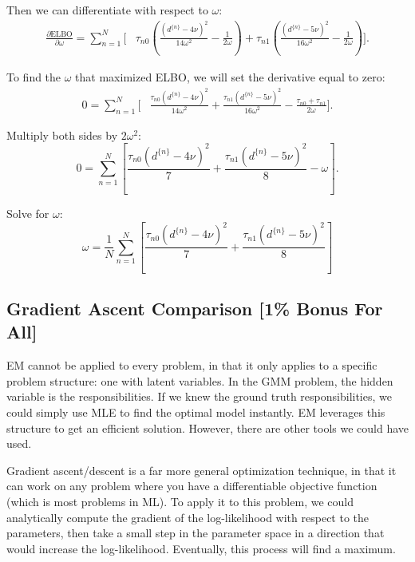 \begin{enumerate}[label=\alph*.]
    Then we can differentiate with respect to \(\omega\):
    \[
    \begin{aligned}
    \frac{\partial\text{ELBO}}{\partial\omega}
    =\sum_{n=1}^N\Bigg[&
    \tau_{n0}\left(
    \frac{(d^{\{n\}}-4\nu)^2}{14\omega^2}
    -\frac{1}{2\omega}\right)
    +\tau_{n1}\left(
    \frac{(d^{\{n\}}-5\nu)^2}{16\omega^2}
    -\frac{1}{2\omega}\right)\Bigg].
    \end{aligned}
    \]
    
    To find the $\omega$ that maximized ELBO, we will set the derivative equal to zero:
    \[
    \begin{aligned}
    0=\sum_{n=1}^N\Bigg[&
    \frac{\tau_{n0}(d^{\{n\}}-4\nu)^2}{14\omega^2}
    +\frac{\tau_{n1}(d^{\{n\}}-5\nu)^2}{16\omega^2}
    -\frac{\tau_{n0}+\tau_{n1}}{2\omega}\Bigg].
    \end{aligned}
    \]
    
    Multiply both sides by \(2\omega^2\):
    \[
    0=\sum_{n=1}^N\left[
    \frac{\tau_{n0}(d^{\{n\}}-4\nu)^2}{7}
    +\frac{\tau_{n1}(d^{\{n\}}-5\nu)^2}{8}
    -\omega\right].
    \]
    
    Solve for \(\omega\):
    \[
    \omega=\frac{1}{N}\sum_{n=1}^N
    \left[
    \frac{\tau_{n0}(d^{\{n\}}-4\nu)^2}{7}
    +\frac{\tau_{n1}(d^{\{n\}}-5\nu)^2}{8}
    \right]
    \]
\end{enumerate}
\newpage




\subsection{Gradient Ascent Comparison [1\% Bonus For All]}

EM cannot be applied to every problem, in that it only applies to a specific problem structure: one with latent variables. In the GMM problem, the hidden variable is the responsibilities. If we knew the ground truth responsibilities, we could simply use MLE to find the optimal model instantly. EM leverages this structure to get an efficient solution. However, there are other tools we could have used.

\smallskip Gradient ascent/descent is a far more general optimization technique, in that it can work on any problem where you have a differentiable objective function (which is most problems in ML). To apply it to this problem, we could analytically compute the gradient of the log-likelihood with respect to the parameters, then take a small step in the parameter space in a direction that would increase the log-likelihood. Eventually, this process will find a maximum.

